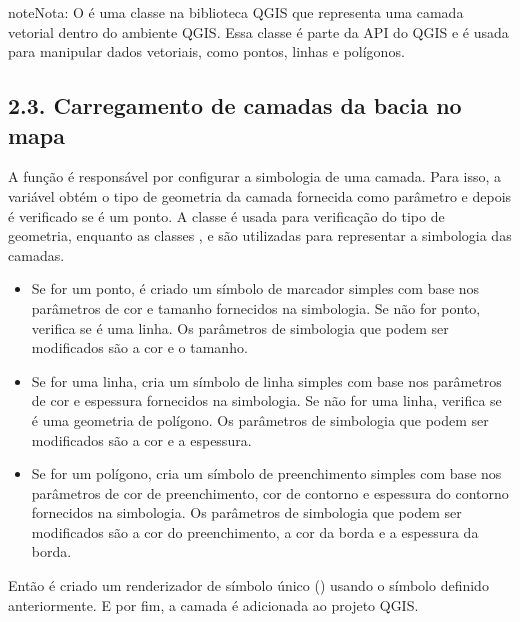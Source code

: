 \documentclass[a4paper,10pt,brazil]{sphinxmanual}
\begin{document}
\begin{sphinxadmonition}{note}{Nota:}
\sphinxAtStartPar
O  é uma classe na biblioteca QGIS que representa uma camada vetorial dentro do ambiente QGIS. Essa classe é parte da API do QGIS e é usada para manipular dados vetoriais, como pontos, linhas e polígonos.
\end{sphinxadmonition}


\subsection{2.3. Carregamento de camadas da bacia no mapa}
\label{\detokenize{2inicializacaoMapa:carregamento-de-camadas-da-bacia-no-mapa}}
\sphinxAtStartPar
A função  é responsável por configurar a simbologia de uma camada. Para isso, a variável  obtém o tipo de geometria da camada fornecida como parâmetro e depois é verificado se é um ponto. A classe  é usada para verificação do tipo de geometria, enquanto as classes ,  e  são utilizadas para representar a simbologia das camadas.
\begin{itemize}
\item {} 
\sphinxAtStartPar
Se for um ponto, é criado um símbolo de marcador simples com base nos parâmetros de cor e tamanho fornecidos na simbologia. Se não for ponto, verifica se é uma linha. Os parâmetros de simbologia que podem ser modificados são a cor e o tamanho.

\item {} 
\sphinxAtStartPar
Se for uma linha, cria um símbolo de linha simples com base nos parâmetros de cor e espessura fornecidos na simbologia. Se não for uma linha, verifica se é uma geometria de polígono. Os parâmetros de simbologia que podem ser modificados são a cor e a espessura.

\item {} 
\sphinxAtStartPar
Se for um polígono, cria um símbolo de preenchimento simples com base nos parâmetros de cor de preenchimento, cor de contorno e espessura do contorno fornecidos na simbologia. Os parâmetros de simbologia que podem ser modificados são a cor do preenchimento, a cor da borda e a espessura da borda.

\end{itemize}

\sphinxAtStartPar
Então é criado um renderizador de símbolo único () usando o símbolo definido anteriormente. E por fim, a camada é adicionada ao projeto QGIS.
\end{document}
